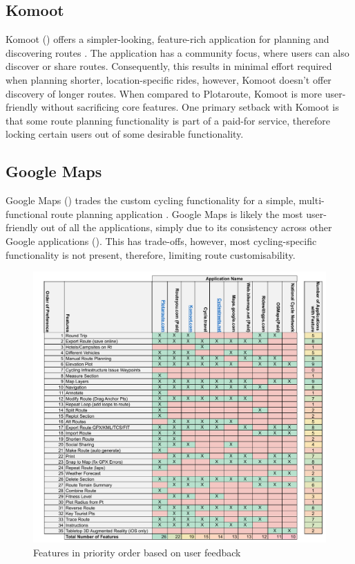 \subsection{Komoot}
\label{litrev:komoot}
Komoot (\cite{noauthor_komoot_nodate}) offers a simpler-looking, feature-rich application for planning and discovering routes . The application has a community focus, where users can also discover or share routes. Consequently, this results in minimal effort required when planning shorter, location-specific rides, however, Komoot doesn't offer discovery of longer routes. When compared to Plotaroute, Komoot is more user-friendly without sacrificing core features. One primary setback with Komoot is that some route planning functionality is part of a paid-for service, therefore locking certain users out of some desirable functionality.

\subsection{Google Maps}
\label{litrev:gmaps}

Google Maps (\cite{noauthor_google_nodate}) trades the custom cycling functionality for a simple, multi-functional route planning application . Google Maps is likely the most user-friendly out of all the applications, simply due to its consistency across other Google applications (\cite{noauthor_material_nodate}). This has trade-offs, however, most cycling-specific functionality is not present, therefore, limiting route customisability.

\label{fig:research-results}
\begin{figure}[h!]
    \centering
    \includegraphics[width=1\linewidth]{figures/current_apps_post_research.pdf}
    \caption{Features in priority order based on user feedback}
    \label{fig:features}
\end{figure}

